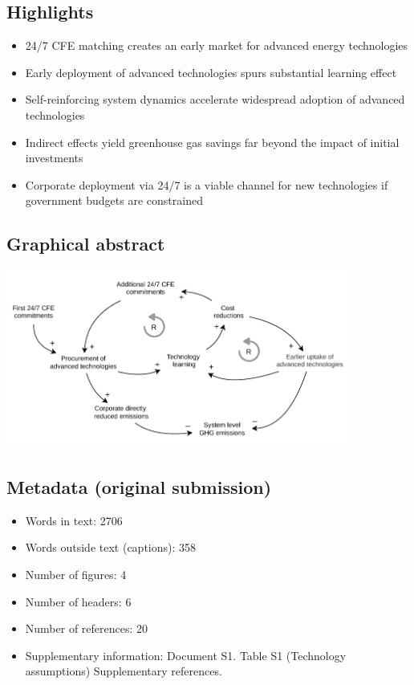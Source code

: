 \documentclass[pdflatex,sn-basic, Numbered]{sn-jnl}
\theoremstyle{thmstyleone}%
\theoremstyle{thmstyletwo}%
\theoremstyle{thmstylethree}%
\begin{document}
\subsection*{Highlights}

\begin{itemize}
\item 24/7 CFE matching creates an early market for advanced energy technologies
\item Early deployment of advanced technologies spurs substantial learning effect
\item Self-reinforcing system dynamics accelerate widespread adoption of advanced technologies
\item Indirect effects yield greenhouse gas savings far beyond the impact of initial investments
\item Corporate deployment via 24/7 is a viable channel for new technologies if government budgets are constrained
\end{itemize}

\subsection*{Graphical abstract}

\begin{center}
    \includegraphics[width=0.85\textwidth]{images/virtuous_dynamics.pdf}
\end{center}

\subsection*{Metadata (original submission)}
\begin{itemize}
    \item Words in text: 2706
    \item Words outside text (captions): 358
    \item Number of figures: 4
    \item Number of headers: 6
    \item Number of references: 20
    \item Supplementary information: Document S1. Table S1 (Technology assumptions) Supplementary references.
\end{itemize}
\end{document}
